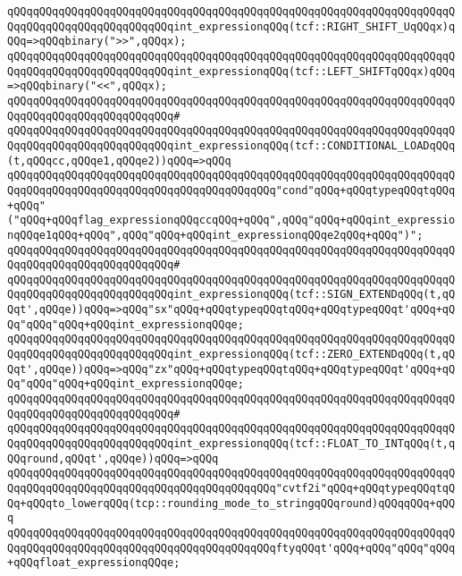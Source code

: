 \verb|qQQqqQQqqQQqqQQqqQQqqQQqqQQqqQQqqQQqqQQqqQQqqQQqqQQqqQQqqQQqqQQqqQQqqQQqqQQqqQQqqQQqqQQqqQQqqQQqint_expressionqQQq(tcf::RIGHT_SHIFT_UqQQqx)qQQq=>qQQqbinary(">>",qQQqx);|\newline
\verb|qQQqqQQqqQQqqQQqqQQqqQQqqQQqqQQqqQQqqQQqqQQqqQQqqQQqqQQqqQQqqQQqqQQqqQQqqQQqqQQqqQQqqQQqqQQqqQQqint_expressionqQQq(tcf::LEFT_SHIFTqQQqx)qQQq=>qQQqbinary("<<",qQQqx);|\newline
\verb|qQQqqQQqqQQqqQQqqQQqqQQqqQQqqQQqqQQqqQQqqQQqqQQqqQQqqQQqqQQqqQQqqQQqqQQqqQQqqQQqqQQqqQQqqQQqqQQq#|\newline
\verb|qQQqqQQqqQQqqQQqqQQqqQQqqQQqqQQqqQQqqQQqqQQqqQQqqQQqqQQqqQQqqQQqqQQqqQQqqQQqqQQqqQQqqQQqqQQqqQQqint_expressionqQQq(tcf::CONDITIONAL_LOADqQQq(t,qQQqcc,qQQqe1,qQQqe2))qQQq=>qQQq|\newline
\verb|qQQqqQQqqQQqqQQqqQQqqQQqqQQqqQQqqQQqqQQqqQQqqQQqqQQqqQQqqQQqqQQqqQQqqQQqqQQqqQQqqQQqqQQqqQQqqQQqqQQqqQQqqQQqqQQq"cond"qQQq+qQQqtypeqQQqtqQQq+qQQq"("qQQq+qQQqflag_expressionqQQqccqQQq+qQQq",qQQq"qQQq+qQQqint_expressionqQQqe1qQQq+qQQq",qQQq"qQQq+qQQqint_expressionqQQqe2qQQq+qQQq")";|\newline
\verb|qQQqqQQqqQQqqQQqqQQqqQQqqQQqqQQqqQQqqQQqqQQqqQQqqQQqqQQqqQQqqQQqqQQqqQQqqQQqqQQqqQQqqQQqqQQqqQQq#|\newline
\verb|qQQqqQQqqQQqqQQqqQQqqQQqqQQqqQQqqQQqqQQqqQQqqQQqqQQqqQQqqQQqqQQqqQQqqQQqqQQqqQQqqQQqqQQqqQQqqQQqint_expressionqQQq(tcf::SIGN_EXTENDqQQq(t,qQQqt',qQQqe))qQQq=>qQQq"sx"qQQq+qQQqtypeqQQqtqQQq+qQQqtypeqQQqt'qQQq+qQQq"qQQq"qQQq+qQQqint_expressionqQQqe;|\newline
\verb|qQQqqQQqqQQqqQQqqQQqqQQqqQQqqQQqqQQqqQQqqQQqqQQqqQQqqQQqqQQqqQQqqQQqqQQqqQQqqQQqqQQqqQQqqQQqqQQqint_expressionqQQq(tcf::ZERO_EXTENDqQQq(t,qQQqt',qQQqe))qQQq=>qQQq"zx"qQQq+qQQqtypeqQQqtqQQq+qQQqtypeqQQqt'qQQq+qQQq"qQQq"qQQq+qQQqint_expressionqQQqe;|\newline
\verb|qQQqqQQqqQQqqQQqqQQqqQQqqQQqqQQqqQQqqQQqqQQqqQQqqQQqqQQqqQQqqQQqqQQqqQQqqQQqqQQqqQQqqQQqqQQqqQQq#|\newline
\verb|qQQqqQQqqQQqqQQqqQQqqQQqqQQqqQQqqQQqqQQqqQQqqQQqqQQqqQQqqQQqqQQqqQQqqQQqqQQqqQQqqQQqqQQqqQQqqQQqint_expressionqQQq(tcf::FLOAT_TO_INTqQQq(t,qQQqround,qQQqt',qQQqe))qQQq=>qQQq|\newline
\verb|qQQqqQQqqQQqqQQqqQQqqQQqqQQqqQQqqQQqqQQqqQQqqQQqqQQqqQQqqQQqqQQqqQQqqQQqqQQqqQQqqQQqqQQqqQQqqQQqqQQqqQQqqQQqqQQq"cvtf2i"qQQq+qQQqtypeqQQqtqQQq+qQQqto_lowerqQQq(tcp::rounding_mode_to_stringqQQqround)qQQqqQQq+qQQq|\newline
\verb|qQQqqQQqqQQqqQQqqQQqqQQqqQQqqQQqqQQqqQQqqQQqqQQqqQQqqQQqqQQqqQQqqQQqqQQqqQQqqQQqqQQqqQQqqQQqqQQqqQQqqQQqqQQqqQQqftyqQQqt'qQQq+qQQq"qQQq"qQQq+qQQqfloat_expressionqQQqe;|\newline
